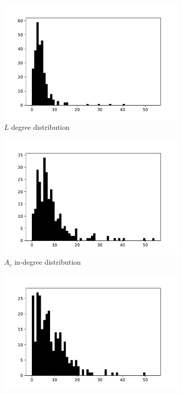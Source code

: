 \documentclass[10pt]{article}
\begin{document}
\begin{figure}[b]\centering
\begin{subfigure}{.3\textwidth}\centering
    \includegraphics[width=\textwidth]{img/L_deg.pdf}
    \caption{\(L\) degree distribution}
\end{subfigure}\hfill
\begin{subfigure}{.3\textwidth}\centering
    \includegraphics[width=\textwidth]{img/Ac_deg_in.pdf}
    \caption{\(A_c\) in-degree distribution}
\end{subfigure}\hfill
\begin{subfigure}{.3\textwidth}\centering
    \includegraphics[width=\textwidth]{img/Ac_deg_out.pdf}

\end{subfigure}
\end{figure}
\end{document}
